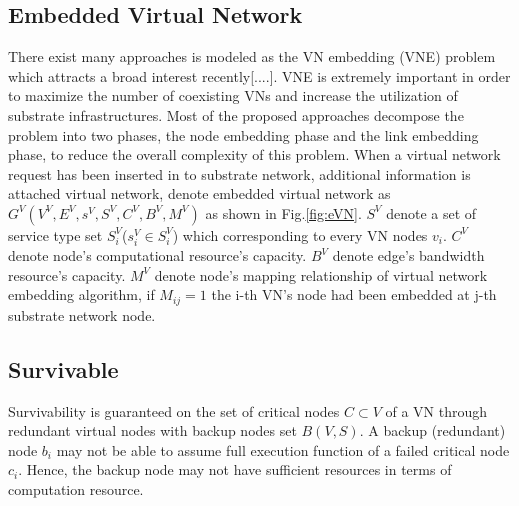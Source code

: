 \subsection{Embedded Virtual Network}
\label{sec:embeddedVirtualNetwork}
There exist many approaches is modeled as the VN embedding (VNE) problem which attracts a broad interest recently[....]. VNE is extremely important in order to maximize the number of coexisting VNs and increase the utilization of substrate infrastructures. Most of the proposed approaches decompose the problem into two phases, the node embedding phase and the link embedding phase, to reduce the overall complexity of this problem. When a virtual network request has been inserted in to substrate network, additional information is attached virtual network, denote embedded virtual network as $G^V (V^V,E^V,s^V,S^V,C^V,B^V,M^V)$ as shown in Fig.\ref{fig:eVN}. $S^V$ denote a set of service type set $S^V_i$($s^V_i\in S^V_i$) which corresponding to every VN nodes $v_i$. $C^V$ denote node's computational resource's capacity. $B^V$ denote edge's bandwidth resource's capacity. $M^V$ denote node's mapping relationship of virtual network embedding algorithm, if $M_{ij}=1$ the i-th VN's node had been embedded at j-th substrate network node.

\subsection{Survivable}

Survivability is guaranteed on the set of critical nodes $C\subset V$ of a VN through redundant virtual nodes with backup nodes set $B(V,S)$. A backup (redundant) node $b_i$ may not be able to assume full execution function of a failed critical node $c_i$. Hence, the backup node may not have sufficient resources in terms of computation resource.







